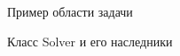 \documentclass{beamer}
\begin{document}
\begin{frame}{Пример области задачи}
	\begin{figure}[h]
		\label{ris:2Block_ex}
	\end{figure}
\end{frame}






\begin{frame}{Класс Solver и его наследники}
	\begin{figure}[h]
		\label{ris:solvers}
	\end{figure}
\end{frame}
\end{document}
